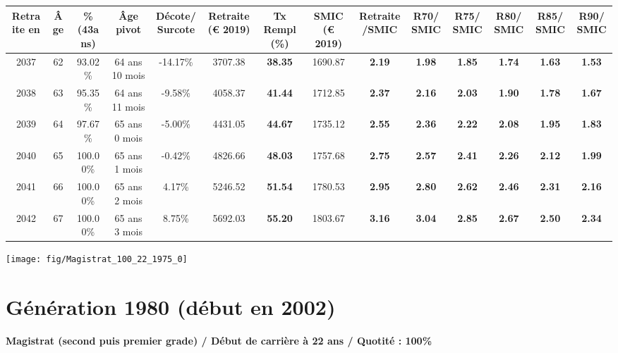 \begin{adjustbox}{max width=\textwidth} 
\begin{tabular}[htb]{|c|c||c|c|c||c|c||c|c||c|c|c|c|c|} 
\hline 
 Retraite en &  Âge &  \%(43ans) &  Âge pivot &  Décote/Surcote &  Retraite (\euro{} 2019) &  Tx Rempl(\%) &  SMIC (\euro{} 2019) &  Retraite/SMIC &  R70/SMIC &  R75/SMIC &  R80/SMIC &  R85/SMIC &  R90/SMIC \\ 
\hline \hline 
 2037 &  62 &  93.02\% &  64 ans 10 mois &  -14.17\% &  3707.38 &  {\bf 38.35} &  1690.87 &  {\bf 2.19} &  {\bf 1.98} &  {\bf 1.85} &  {\bf 1.74} &  {\bf 1.63} &  {\bf 1.53} \\ 
\hline 
 2038 &  63 &  95.35\% &  64 ans 11 mois &  -9.58\% &  4058.37 &  {\bf 41.44} &  1712.85 &  {\bf 2.37} &  {\bf 2.16} &  {\bf 2.03} &  {\bf 1.90} &  {\bf 1.78} &  {\bf 1.67} \\ 
\hline 
 2039 &  64 &  97.67\% &  65 ans 0 mois &  -5.00\% &  4431.05 &  {\bf 44.67} &  1735.12 &  {\bf 2.55} &  {\bf 2.36} &  {\bf 2.22} &  {\bf 2.08} &  {\bf 1.95} &  {\bf 1.83} \\ 
\hline 
 2040 &  65 &  100.00\% &  65 ans 1 mois &  -0.42\% &  4826.66 &  {\bf 48.03} &  1757.68 &  {\bf 2.75} &  {\bf 2.57} &  {\bf 2.41} &  {\bf 2.26} &  {\bf 2.12} &  {\bf 1.99} \\ 
\hline 
 2041 &  66 &  100.00\% &  65 ans 2 mois &  4.17\% &  5246.52 &  {\bf 51.54} &  1780.53 &  {\bf 2.95} &  {\bf 2.80} &  {\bf 2.62} &  {\bf 2.46} &  {\bf 2.31} &  {\bf 2.16} \\ 
\hline 
 2042 &  67 &  100.00\% &  65 ans 3 mois &  8.75\% &  5692.03 &  {\bf 55.20} &  1803.67 &  {\bf 3.16} &  {\bf 3.04} &  {\bf 2.85} &  {\bf 2.67} &  {\bf 2.50} &  {\bf 2.34} \\ 
\hline 
\hline 
\end{tabular} 
\end{adjustbox} 
 
 \vspace{0.1cm} 

 {\hspace{-2.2cm}\texttt{[image: fig/Magistrat\_100\_22\_1975\_0]}} 

\newpage 
 
\section{Génération 1980 (début en 2002)\label{Magistrat_100_22_1980_0}} 
 
{\bf \noindent Magistrat (second puis premier grade) / Début de carrière à 22 ans / Quotité : 100\%}  ~ 

